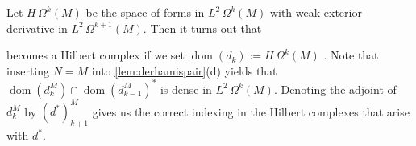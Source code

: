 \documentclass[11pt]{article}
\theoremstyle{definition}
\theoremstyle{remark}
\DeclareMathOperator\dom{dom}
\begin{document}
Let $H\, \Omega^k(M)$ be the space of forms in $L^2 \, \Omega^k(M)$ with weak exterior derivative in $L^2 \, \Omega^{k+1} (M)$. Then it turns out that 

\begin{center}
\end{center}
becomes a Hilbert complex if we set $\dom(d_k):=H\, \Omega^k(M)$ \citep[\S4.2]{finderham}. Note that inserting $N=M$ into \cref{lem:derhamispair}(d) yields that $\dom(d_k^M) \cap \dom(d_{k-1}^M)^*$ is dense in $L^2 \, \Omega^k(M)$.  Denoting the adjoint of $d_k^M$ by $(d^*)_{k+1}^M$ gives us the correct indexing in the Hilbert complexes that arise with $d^*$.
\end{document}
